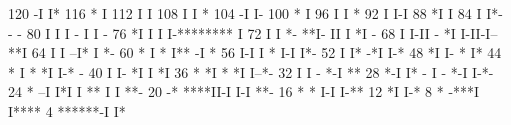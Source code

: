 \begin{Listing}
      120                               -I        I*
      116                               *         I
      112                               I         I
      108                               I         I *
      104                              -I         I-
      100                              *           I
       96                              I           I *
       92                              I           I-I
       88                             *I             I
       84                             I              I*-                              - -
       80                             I              I I                        -     I I  -
       76                            *I              I I                        I-******** I
       72                             I              I *-                       **I- II I *I -
       68                             I              I-II                    - *I  I-II-I--**I
       64                             I                 I                  --I* I            *-
       60                           * I                 *                  I** -I             *
       56                           I-I                 I                  * I-I              I*-
       52                           I                   I*               -*I                  I-*
       48                          *I                    I-              *                      I*
       44       *                  I                      *             *I                      I-* -
       40                          I                      I-           *I                        I *I
       36        *                *I                       *          *I                         I--*-
       32                          I                       I    -    *-I                             **
       28                        *-I                       I* - I - *-I                              I-*-
       24         *             --I                         I*I I ** I                                I **-
       20                      -*                             ****II-I                                I-I **-
       16          *           *                              I-I                                         I-**
       12                     *I                                                                            I-*
        8           *     -***I                                                                               I****
        4            ******-I                                                                                     I*

\end{Listing}
